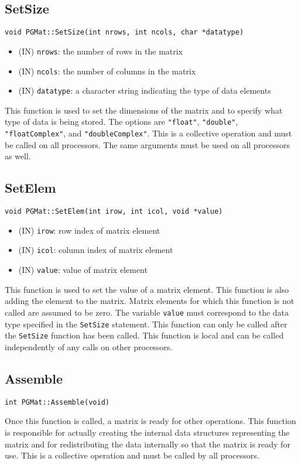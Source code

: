 \documentclass[12pt]{article}
\begin{document}
\subsection{SetSize}
\begin{verbatim}
void PGMat::SetSize(int nrows, int ncols, char *datatype)
\end{verbatim}
\begin{itemize}
\item (IN) \texttt{nrows}: the number of rows in the matrix
\item (IN) \texttt{ncols}: the number of columns in the matrix
\item (IN) \texttt{datatype}: a character string indicating the type of data
elements
\end{itemize}
This function is used to set the dimensions of the matrix and to specify what
type of data is being stored. The options are \texttt{"float"},
\texttt{"double"}, \texttt{"floatComplex"}, and \texttt{"doubleComplex"}. This
is a collective operation and must be called on all processors. The same
arguments must be used on all processors as well.
\subsection{SetElem}
\begin{verbatim}
void PGMat::SetElem(int irow, int icol, void *value)
\end{verbatim}
\begin{itemize}
\item (IN) \texttt{irow}: row index of matrix element
\item (IN) \texttt{icol}: column index of matrix element
\item (IN) \texttt{value}: value of matrix element
\end{itemize}
This function is used to set the value of a matrix element. This function is
also adding the element to the matrix. Matrix elements for which this function is
not called are assumed to be zero. The variable \texttt{value} must correspond
to the data type specified in the \texttt{SetSize} statement. This function can
only be called after the \texttt{SetSize} function has been called. This
function is local and can be called independently of any calls on other
processors.
\subsection{Assemble}
\begin{verbatim}
int PGMat::Assemble(void)
\end{verbatim}
Once this function is called, a matrix is ready for other operations. This
function is responsible for actually creating the internal data structures
representing the matrix and for redistributing the data internally so that the
matrix is ready for use. This is a collective operation and must be called by
all processors.
\end{document}
